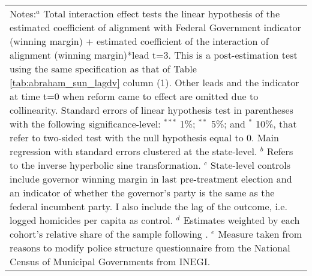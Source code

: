 \begin{table}[htbp]
{\begin{tabular}{lcccc}
\multicolumn{5}{p{1.2\textwidth}}{\footnotesize{Notes:$^a$ Total interaction effect tests the linear hypothesis of the estimated coefficient of alignment with Federal Government indicator (winning margin) + estimated coefficient of the interaction of alignment (winning margin)*lead t=3. This is a post-estimation test using the same specification as that of Table \ref{tab:abraham_sun_lagdv} column (1). Other leads and the indicator at time t=0 when reform came to effect are omitted due to collinearity. Standard errors of linear hypothesis test in parentheses with the following significance-level: $^{***}$ 1\%; $^{**}$ 5\%; and $^*$ 10\%, that refer to two-sided test with the null hypothesis equal to 0. Main regression with standard errors clustered at the state-level. $^b$ Refers to the inverse hyperbolic sine transformation. $^c$ State-level controls include governor winning margin in last pre-treatment election and an indicator of whether the governor's party is the same as the federal incumbent party. I also include the lag of the outcome, i.e. logged homicides per capita as control. $^d$ Estimates weighted by each cohort's relative share of the sample following \citet{abraham_sun_2020}.} $^e$ Measure taken from reasons to modify police structure questionnaire from the National Census of Municipal Governments from INEGI.} \\
\end{tabular}
}
\end{table}

